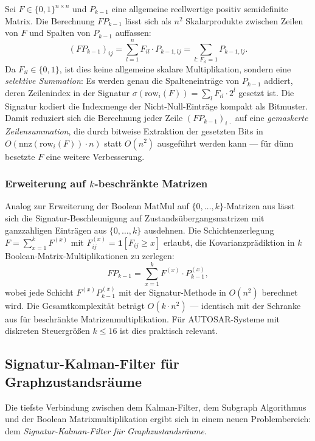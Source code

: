 ﻿\documentclass[a4paper,12pt]{article}
\theoremstyle{definition}
\begin{document}
Sei $F \in \{0,1\}^{n\times n}$ und $P_{k-1}$ eine allgemeine reellwertige
positiv semidefinite Matrix. Die Berechnung $F P_{k-1}$ lässt sich als $n^2$
Skalarprodukte zwischen Zeilen von $F$ und Spalten von $P_{k-1}$ auffassen:
\[
    (F P_{k-1})_{ij} = \sum_{l=1}^n F_{il} \cdot P_{k-1,lj}
    = \sum_{l:\, F_{il}=1} P_{k-1,lj}.
\]
Da $F_{il} \in \{0,1\}$, ist dies keine allgemeine skalare Multiplikation, sondern
eine \emph{selektive Summation}: Es werden genau die Spalteneinträge von $P_{k-1}$
addiert, deren Zeilenindex in der Signatur $\sigma(\text{row}_i(F)) = \sum_l F_{il}\cdot 2^l$
gesetzt ist. Die Signatur kodiert die Indexmenge der Nicht-Null-Einträge kompakt
als Bitmuster. Damit reduziert sich die Berechnung jeder Zeile $(FP_{k-1})_{i\,\cdot}$
auf eine \emph{gemaskerte Zeilensummation}, die durch bitweise Extraktion der
gesetzten Bits in $O(\text{nnz}(\text{row}_i(F)) \cdot n)$ statt $O(n^2)$ ausgeführt
werden kann --- für dünn besetzte $F$ eine weitere Verbesserung.

\subsubsection{Erweiterung auf $k$-beschränkte Matrizen}

Analog zur Erweiterung der Boolean MatMul auf $\{0,\ldots,k\}$-Matrizen aus
\cite{epp2026boolmm} lässt sich die Signatur-Beschleunigung auf Zustandsübergangs\-matrizen
mit ganzzahligen Einträgen aus $\{0,\ldots,k\}$ ausdehnen. Die Schichtenzerlegung
$F = \sum_{x=1}^k F^{(x)}$ mit $F^{(x)}_{ij} = \mathbf{1}[F_{ij} \geq x]$ erlaubt,
die Kovarianzprädiktion in $k$ Boolean-Matrix-Multiplikationen zu zerlegen:
\[
    F P_{k-1} = \sum_{x=1}^k F^{(x)} \cdot P_{k-1}^{(x)},
\]
wobei jede Schicht $F^{(x)} P_{k-1}^{(x)}$ mit der Signatur-Methode in $O(n^2)$
berechnet wird. Die Gesamtkomplexität beträgt $O(k \cdot n^2)$ --- identisch mit
der Schranke aus \cite{epp2026boolmm} für beschränkte Matrizenmultiplikation.
Für AUTOSAR-Systeme mit diskreten Steuergrößen $k \leq 16$ ist dies praktisch relevant.

\subsection{Signatur-Kalman-Filter für Graphzustandsräume}

Die tiefste Verbindung zwischen dem Kalman-Filter, dem Subgraph Algorithmus
\cite{epp2026} und der Boolean Matrixmultiplikation \cite{epp2026boolmm} ergibt
sich in einem neuen Problembereich: dem \emph{Signatur-Kalman-Filter für Graphzustandsräume}.
\end{document}
